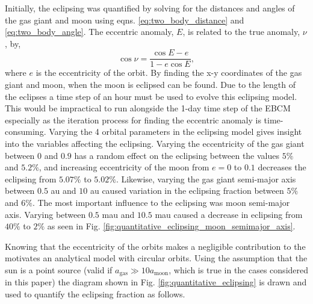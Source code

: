\documentclass[12pt, onecolumn]{revtex4-2}    %
\begin{document}
Initially, the eclipsing was quantified by solving for the distances and angles of the gas giant and moon using eqns. \eqref{eq:two_body_distance} and \eqref{eq:two_body_angle}.
The eccentric anomaly, $E$, is related to the true anomaly, $\nu$, by,
\begin{equation}
  \cos \nu =  \frac{\cos E - e}{1 - e \cos E},
  \label{eq:true_anomaly}
\end{equation}
where $e$ is the eccentricity of the orbit.
By finding the x-y coordinates of the gas giant and moon, when the moon is eclipsed can be found.
Due to the length of the eclipses a time step of an hour must be used to evolve this eclipsing model.
This would be impractical to run alongside the 1-day time step of the EBCM especially as the iteration process for finding the eccentric anomaly is time-consuming.
Varying the 4 orbital parameters in the eclipsing model gives insight into the variables affecting the eclipsing.
Varying the eccentricity of the gas giant between $0$ and $0.9$ has a random effect on the eclipsing between the values $5\%$ and $5.2\%$, and increasing eccentricity of the moon from $e=0$ to $0.1$ decreases the eclipsing from $5.07\%$ to $5.02\%$.
Likewise, varying the gas giant semi-major axis between $0.5$ au and $10$ au caused variation in the eclipsing fraction between $5\%$ and $6\%$. 
The most important influence to the eclipsing was moon semi-major axis.
Varying between $0.5$ mau and $10.5$ mau caused a decrease in eclipsing from $40\%$ to $2\%$ as seen in Fig. \ref{fig:quantitative_eclipsing_moon_semimajor_axis}.

Knowing that the eccentricity of the orbits makes a negligible contribution to the motivates an analytical model with circular orbits.
Using the assumption that the sun is a point source (valid if $a_\text{gas} \gg 10a_\text{moon}$, which is true in the cases considered in this paper) the diagram shown in Fig. \ref{fig:quantitative_eclipsing} is drawn and used to quantify the eclipsing fraction as follows.
\end{document}
